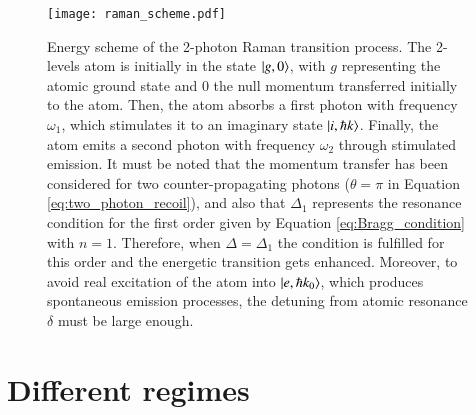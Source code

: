 \cite{Kozuma1999,Martin1988,Giltner1995}

\begin{figure}[!htbp]\centering
	\texttt{[image: raman\_scheme.pdf]}
	\caption[Energy scheme of the 2-photon Raman transition process]{Energy scheme of the 2-photon Raman transition process. The 2-levels atom is initially in the state $\ket{g, 0}$, with $g$ representing the atomic ground state and 0 the null momentum transferred initially to the atom. Then, the atom absorbs a first photon with frequency $\omega_1$, which stimulates it to an imaginary state $\ket{i, \hbar k}$. Finally, the atom emits a second photon with frequency $\omega_2$ through stimulated emission. It must be noted that the momentum transfer has been considered for two counter-propagating photons ($\theta=\pi$ in Equation \eqref{eq:two_photon_recoil}), and also that $\Delta_1$ represents the resonance condition for the first order given by Equation \eqref{eq:Bragg_condition} with $n=1$. Therefore, when $\Delta = \Delta_1$ the condition is fulfilled for this order and the energetic transition gets enhanced. Moreover, to avoid real excitation of the atom into $\ket{e, \hbar k_0}$, which produces spontaneous emission processes, the detuning from atomic resonance $\delta$ must be large enough. }\label{fig:raman_scheme}
\end{figure}

\newpage

\section{Different regimes}



